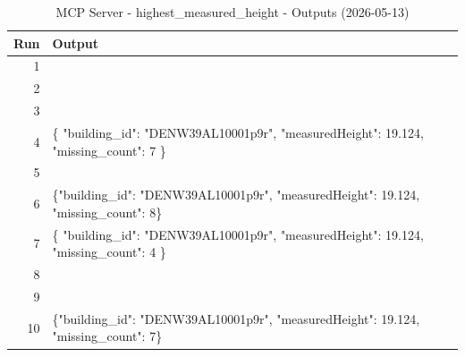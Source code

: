 \documentclass[a4paper,11pt]{article}
\begin{document}
\begin{table}[ht]
\centering
\scriptsize
\caption{MCP Server - highest\_measured\_height - Outputs (2026-05-13)}
\label{tab:mcp\_highest\_measured\_height\_outputs\_2026-05-13}
\begin{tabular}{r p{12cm}}
\hline
Run & Output \\
\hline
1 &  \\
2 &  \\
3 &  \\
4 & \{
  "building\_id": "DENW39AL10001p9r",
  "measuredHeight": 19.124,
  "missing\_count": 7
\} \\
5 &  \\
6 & \{"building\_id": "DENW39AL10001p9r", "measuredHeight": 19.124, "missing\_count": 8\} \\
7 & \{
  "building\_id": "DENW39AL10001p9r",
  "measuredHeight": 19.124,
  "missing\_count": 4
\} \\
8 &  \\
9 &  \\
10 & \{"building\_id": "DENW39AL10001p9r", "measuredHeight": 19.124, "missing\_count": 7\} \\
\hline
\end{tabular}
\end{table}

\clearpage
\end{document}
